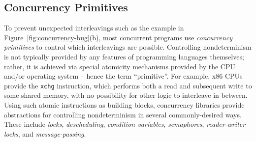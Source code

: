 \subsection{Concurrency Primitives}

To prevent unexpected interleavings such as the example in Figure~\ref{fig:concurrency-bug}(b),
most concurrent programs use {\em concurrency primitives} to control which interleavings are possible.
Controlling nondeterminism is not typically provided by any features of programming languages themselves;
rather, it is achieved via special atomicity mechanisms provided by the CPU and/or operating system -- hence the term ``primitive''.
For example, x86 CPUs provide the {\tt xchg} instruction, which performs both a read and subsequent write to some shared memory, with no possibility for other logic to interleave in between.
Using such atomic instructions as building blocks, concurrency libraries provide abstractions for controlling nondeterminism in several commonly-desired ways.
These include {\em locks}, {\em descheduling}, {\em condition variables}, {\em semaphores}, {\em reader-writer locks}, and {\em message-passing}.


